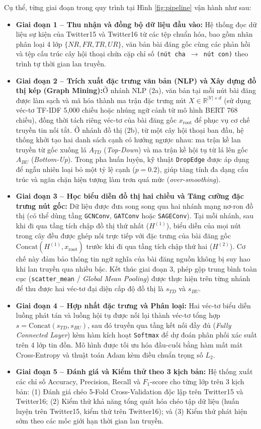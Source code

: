 \documentclass[11pt,a4paper]{extreport}
\begin{document}
Cụ thể, từng giai đoạn trong quy trình tại Hình \ref{fig:pipeline} vận hành như sau:
\begin{itemize}
    \item \textbf{Giai đoạn 1 -- Thu nhận và đồng bộ dữ liệu đầu vào:} Hệ thống đọc dữ liệu sự kiện của Twitter15 và Twitter16 từ các tệp chuẩn hóa, bao gồm nhãn phân loại 4 lớp $\{NR, FR, TR, UR\}$, văn bản bài đăng gốc cùng các phản hồi và tệp cấu trúc cây hội thoại chứa cặp chỉ số \texttt{(nút cha $\rightarrow$ nút con)} theo trình tự thời gian lan truyền.
    \item \textbf{Giai đoạn 2 -- Trích xuất đặc trưng văn bản (NLP) và Xây dựng đồ thị kép (Graph Mining):}Ở nhánh NLP (2a), văn bản tại mỗi nút bài đăng được làm sạch và mã hóa thành ma trận đặc trưng nút $X \in \mathbb{R}^{|V| \times d}$ (sử dụng véc-tơ TF-IDF 5,000 chiều hoặc nhúng ngữ cảnh từ mô hình BERT 768 chiều), đồng thời tách riêng véc-tơ của bài đăng gốc $x_{\text{root}}$ để phục vụ cơ chế truyền tin nối tắt. Ở nhánh đồ thị (2b), từ một cây hội thoại ban đầu, hệ thống khởi tạo hai danh sách cạnh có hướng ngược nhau: ma trận kề lan truyền từ gốc xuống lá $A_{TD}$ (\textit{Top-Down}) và ma trận kề hội tụ từ lá lên gốc $A_{BU}$ (\textit{Bottom-Up}). Trong pha huấn luyện, kỹ thuật \texttt{DropEdge} được áp dụng để ngẫu nhiên loại bỏ một tỷ lệ cạnh ($p = 0.2$), giúp tăng tính đa dạng cấu trúc và ngăn chặn hiện tượng làm trơn quá mức (\textit{over-smoothing}).
    \item \textbf{Giai đoạn 3 -- Học biểu diễn đồ thị hai chiều và Tăng cường đặc trưng nút gốc:} Dữ liệu được đưa song song qua hai nhánh mạng nơ-ron đồ thị (có thể dùng tầng \texttt{GCNConv}, \texttt{GATConv} hoặc \texttt{SAGEConv}). Tại mỗi nhánh, sau khi đi qua tầng tích chập đồ thị thứ nhất ($H^{(1)}$), biểu diễn của mọi nút trong cây đều được ghép nối trực tiếp với đặc trưng của bài đăng gốc $\text{Concat}(H^{(1)}, x_{\text{root}})$ trước khi đi qua tầng tích chập thứ hai ($H^{(2)}$). Cơ chế này đảm bảo thông tin ngữ nghĩa của bài đăng nguồn không bị suy hao khi lan truyền qua nhiều bậc. Kết thúc giai đoạn 3, phép gộp trung bình toàn cục (\texttt{scatter\_mean} / \textit{Global Mean Pooling}) được thực hiện trên từng nhánh để thu được hai véc-tơ đại diện cấp độ đồ thị là $s_{TD}$ và $s_{BU}$.
    \item \textbf{Giai đoạn 4 -- Hợp nhất đặc trưng và Phân loại:} Hai véc-tơ biểu diễn luồng phát tán và luồng hội tụ được nối lại thành véc-tơ tổng hợp $s = \text{Concat}(s_{TD}, s_{BU})$, sau đó truyền qua tầng kết nối đầy đủ (\textit{Fully Connected Layer}) kèm hàm kích hoạt \texttt{Softmax} để dự đoán phân phối xác suất trên 4 lớp tin đồn. Mô hình được tối ưu hóa đầu-cuối bằng hàm mất mát Cross-Entropy và thuật toán Adam kèm điều chuẩn trọng số $L_2$.
    \item \textbf{Giai đoạn 5 -- Đánh giá và Kiểm thử theo 3 kịch bản:} Hệ thống xuất các chỉ số Accuracy, Precision, Recall và $F_1$-score cho từng lớp trên 3 kịch bản: (1) Đánh giá chéo 5-Fold Cross-Validation độc lập trên Twitter15 và Twitter16; (2) Kiểm thử khả năng tổng quát hóa chéo tập dữ liệu (huấn luyện trên Twitter15, kiểm thử trên Twitter16); và (3) Kiểm thử phát hiện sớm theo các mốc giới hạn thời gian lan truyền.
\end{itemize}
\end{document}

